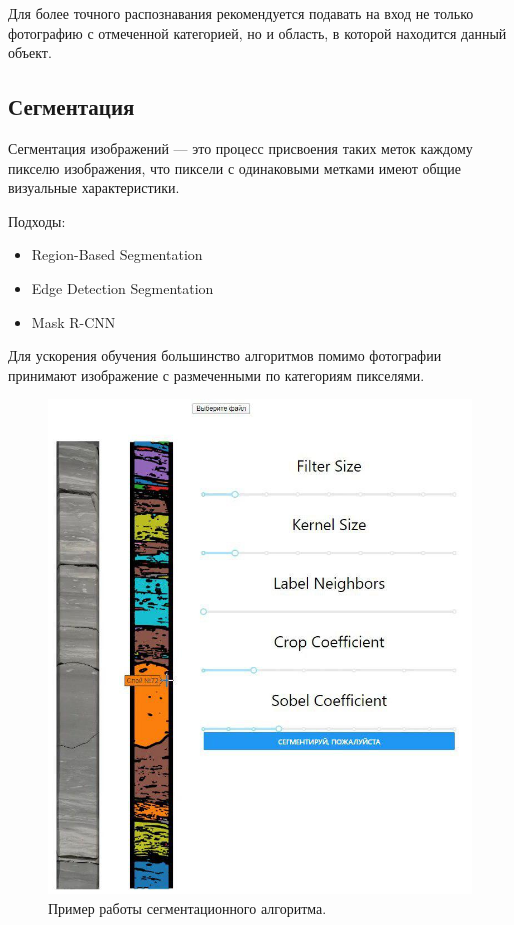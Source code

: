 \documentclass[14pt]{matmex-diploma}
\begin{document}
        Для более точного распознавания рекомендуется подавать на вход не только фотографию с отмеченной категорией, но и область, в которой находится данный объект.
        
    \subsection{Сегментация}
    
        Сегментация изображений — это процесс присвоения таких меток каждому пикселю изображения, что пиксели с одинаковыми метками имеют общие визуальные характеристики.
    
        Подходы:
        \begin{itemize}
            \item Region-Based Segmentation
            \item Edge Detection Segmentation
            \item Mask R-CNN
        \end{itemize}
        
        Для ускорения обучения большинство алгоритмов помимо фотографии принимают изображение с размеченными по категориям пикселями.

        \begin{figure}[h]
            \centering
            \includegraphics[scale=0.35]{images/segmentation.jpg}
            \caption{Пример работы сегментационного алгоритма.}
            \label{segmentation}
        \end{figure}
        
\end{document}
